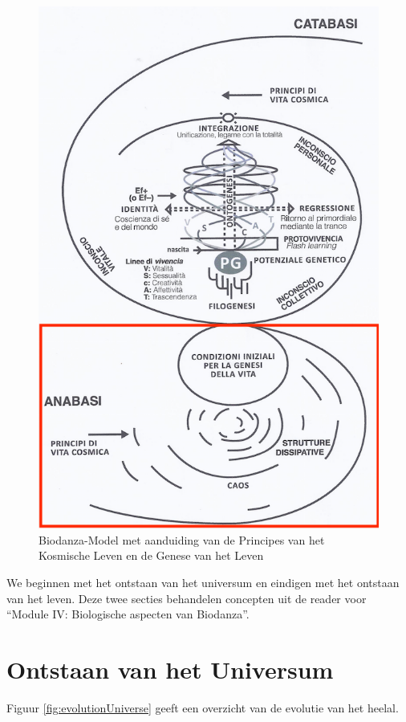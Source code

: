 \documentclass[
  11pt,
]{book}
\begin{document}
\begin{figure}

{\centering \includegraphics[width=0.5\linewidth]{./figs/biologischeAspectenBiodanzaDeelI} 

}

\caption{Biodanza-Model met aanduiding van de Principes van het Kosmische Leven en de Genese van het Leven}\label{fig:modelCosmic}
\end{figure}

We beginnen met het ontstaan van het universum en eindigen met het ontstaan van het leven. Deze twee secties behandelen concepten uit de reader voor ``Module IV: Biologische aspecten van Biodanza''.

\hypertarget{ontstaan-van-het-universum}{%
\section{Ontstaan van het Universum}\label{ontstaan-van-het-universum}}

Figuur \ref{fig:evolutionUniverse} geeft een overzicht van de evolutie van het heelal.
\end{document}
